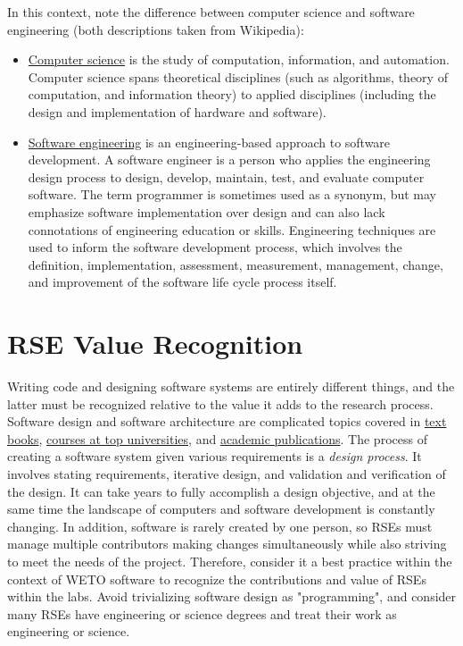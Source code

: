 \documentclass[]{nrel}
\begin{document}
\begin{appendices}
In this context, note the difference between computer science and software engineering (both
descriptions taken from Wikipedia):
\begin{itemize}
\item \href{https://en.wikipedia.org/wiki/Computer_science}{Computer science} is the study of
    computation, information, and automation.
    Computer science spans theoretical disciplines (such as algorithms, theory of computation,
    and information theory) to applied disciplines (including the design and implementation of
    hardware and software).
    
\item \href{https://en.wikipedia.org/wiki/Software_engineering}{Software engineering} is an
    engineering-based approach to software development. A software
    engineer is a person who applies the engineering design process to design, develop, maintain,
    test, and evaluate computer software. The term programmer is sometimes used as a synonym,
    but may emphasize software implementation over design and can also lack connotations of
    engineering education or skills.
    Engineering techniques are used to inform the software development process, which involves the
    definition, implementation, assessment, measurement, management, change, and improvement of
    the software life cycle process itself.
\end{itemize}

\section{RSE Value Recognition}
Writing code and designing software systems are entirely different things, and the latter
must be recognized relative to the value it adds to the research process.
Software design and software architecture are complicated topics covered in
\href{https://www.amazon.com/s?k=software+design&i=stripbooks&crid=2L9GNOIMWHMFD&sprefix=software+design%2Cstripbooks%2C166&ref=nb_sb_noss_2}{text books},
\href{https://web.stanford.edu/~ouster/cs190-winter23/}{courses at top universities}, and
\href{https://www.researchgate.net/search.Search.html?query=software+architecture&type=publication&subfilter%5BpublicationType%5D=article%2Fbook&subfilter%5BstartYear%5D=2022}{academic publications}.
The process of creating a software system given various requirements is a \textit{design process}.
It involves stating requirements, iterative design, and validation and verification of the design.
It can take years to fully accomplish a design objective, and at the same time the landscape of
computers and software development is constantly changing.
In addition, software is rarely created by one person, so RSEs must manage multiple
contributors making changes simultaneously while also striving to meet the needs of the project.
Therefore, consider it a best practice within the context of WETO software to recognize
the contributions and value of RSEs within the labs.
Avoid trivializing software design as "programming", and consider many RSEs have engineering
or science degrees and treat their work as engineering or science.


\end{appendices}
\end{document}

